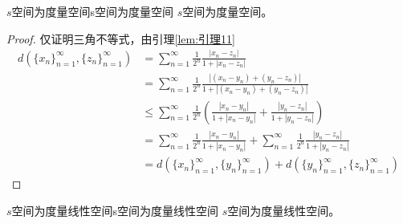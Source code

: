 \documentclass[lang = cn, scheme = chinese, thmcnt = section]{elegantbook}
\begin{document}
\begin{proposition}{$s$空间为度量空间}{s空间为度量空间}
	$s$空间为度量空间。
\end{proposition}

\begin{proof}
	仅证明三角不等式，由引理\ref{lem:引理11}
	\begin{align*}
		d(\{x_n\}_{n=1}^{\infty},\{z_n\}_{n=1}^{\infty})
		& = \sum_{n=1}^{\infty}\frac{1}{2^n}\frac{|x_n-z_n|}{1+|x_n-z_n|}\\
		& = \sum_{n=1}^{\infty}\frac{1}{2^n}\frac{|(x_n-y_n)+(y_n-z_n)|}{1+|(x_n-y_n)+(y_n-z_n)|}\\
		& \le \sum_{n=1}^{\infty}\frac{1}{2^n}\left(\frac{|x_n-y_n|}{1+|x_n-y_n|}+\frac{|y_n-z_n|}{1+|y_n-z_n|}\right)\\
		& = \sum_{n=1}^{\infty}\frac{1}{2^n}\frac{|x_n-y_n|}{1+|x_n-y_n|}+\sum_{n=1}^{\infty}\frac{1}{2^n}\frac{|y_n-z_n|}{1+|y_n-z_n|}\\
		& = d(\{x_n\}_{n=1}^{\infty},\{y_n\}_{n=1}^{\infty})+d(\{y_n\}_{n=1}^{\infty},\{z_n\}_{n=1}^{\infty})
	\end{align*}
\end{proof}

\begin{proposition}{$s$空间为度量线性空间}{s空间为度量线性空间}
	$s$空间为度量线性空间。
\end{proposition}
\end{document}
